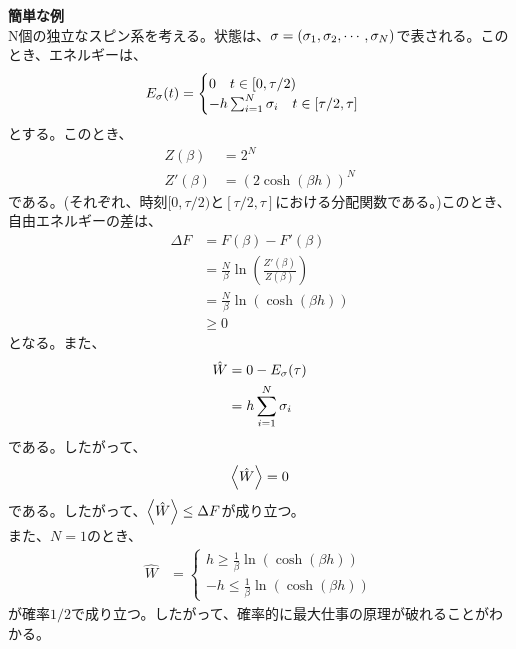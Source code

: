 \documentclass[a4paper,11pt]{jsarticle}
\numberwithin{equation}{section}
\begin{document}
\textbf{簡単な例}\\
N個の独立なスピン系を考える。状態は、$\vb{\sigma} = (\sigma_1,\sigma_2,\cdots,\sigma_N)$で表される。このとき、エネルギーは、
\begin{align}
  E_{\vb{\sigma}} (t) = 
  \begin{cases}
    0 \quad t \in [0,\tau/2)\\
    -h\sum_{i=1}^{N}\sigma_i \quad t \in [\tau/2,\tau]
  \end{cases}
\end{align}
とする。このとき、
\begin{align}
  Z(\beta) &= 2^N\\
  Z'(\beta) &= (2\cosh(\beta h))^N
\end{align}
である。(それぞれ、時刻$[0,\tau/2)$と$[\tau/2,\tau]$における分配関数である。)このとき、自由エネルギーの差は、
\begin{align}
  \Delta F &= F(\beta) - F'(\beta)\\
  &= \frac{N}{\beta}\ln(\frac{Z'(\beta)}{Z(\beta)})\\
  &= \frac{N}{\beta}\ln(\cosh(\beta h))\\
  &\geq 0
\end{align}
となる。また、
\begin{align}
  \hat{W} &= 0 - E_{\vb{\sigma}}(\tau)\\
  &= h\sum_{i=1}^{N}\sigma_i
\end{align}
である。したがって、
\begin{align}
  \ev{\hat{W}} = 0
\end{align}
である。したがって、$\ev{\hat{W}} \leq \Delta F$が成り立つ。\\
また、$N=1$のとき、
\begin{align}
  \hat{W} &= 
  \begin{cases}
    h \geq \frac{1}{\beta}\ln(\cosh(\beta h))\\
    -h \leq \frac{1}{\beta}\ln(\cosh(\beta h))
  \end{cases}
\end{align}
が確率$1/2$で成り立つ。したがって、確率的に最大仕事の原理が破れることがわかる。\\
\end{document}

